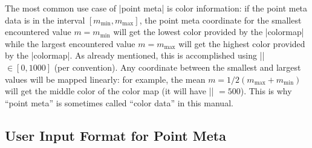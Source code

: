 The most common use case of |point meta| is color information: if the point
meta data is in the interval $[m_{\min},m_{\max}]$, the point meta coordinate
for the smallest encountered value $m = m_{\min}$ will get the lowest color
provided by the |colormap| while the largest encountered value $m=m_{\max}$
will get the highest color provided by the |colormap|. As already mentioned,
this is accomplished using |\pgfplotspointmetatransformed| $\in [0,1000]$ (per
convention). Any coordinate between the smallest and largest values will be
mapped linearly: for example, the mean $m = 1/2 (m_{\max} + m_{\min})$ will get
the middle color of the color map (it will have |\pgfplotspointmetatransformed|
$=500$). This is why ``point meta'' is sometimes called ``color data'' in this
manual.

\begin{codeexample}[]
\end{codeexample}


\subsection{User Input Format for Point Meta}

